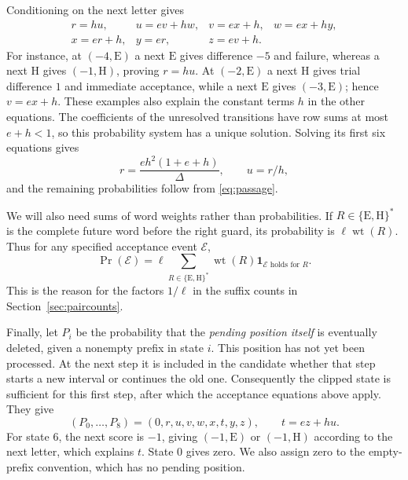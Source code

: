 \documentclass[11pt,a4paper]{article}
\theoremstyle{definition}
\theoremstyle{remark}
\newcommand{\wt}{\operatorname{wt}}
\newcommand{\E}{\mathrm E}
\newcommand{\HH}{\mathrm H}
\newcommand{\ind}{\mathbf1}
\begin{document}
Conditioning on the next letter gives
\begin{equation}\label{eq:passage}
\begin{array}{llll}
r=hu,&u=ev+hw,&v=ex+h,&w=ex+hy,\\
x=er+h,&y=er,&z=ev+h.&
\end{array}
\end{equation}
For instance, at $(-4,\E)$ a next $\E$ gives difference $-5$ and failure, whereas a next $\HH$ gives $(-1,\HH)$, proving $r=hu$. At $(-2,\E)$ a next $\HH$ gives trial difference $1$ and immediate acceptance, while a next $\E$ gives $(-3,\E)$; hence $v=ex+h$. These examples also explain the constant terms $h$ in the other equations. The coefficients of the unresolved transitions have row sums at most $e+h<1$, so this probability system has a unique solution. Solving its first six equations gives
\begin{equation}\label{eq:rclosed}
r=\frac{eh^2(1+e+h)}{\Delta},\qquad u=r/h,
\end{equation}
and the remaining probabilities follow from \eqref{eq:passage}.

We will also need sums of word weights rather than probabilities. If $R\in\{\E,\HH\}^*$ is the complete future word before the right guard, its probability is $\ell\wt(R)$. Thus for any specified acceptance event $\mathcal E$,
\begin{equation}\label{eq:suffix-normalization}
\Pr(\mathcal E)=\ell\sum_{R\in\{\E,\HH\}^*}\wt(R)\ind_{\mathcal E\text{ holds for }R}.
\end{equation}
This is the reason for the factors $1/\ell$ in the suffix counts in Section~\ref{sec:paircounts}.

Finally, let $P_i$ be the probability that the \emph{pending position itself} is eventually deleted, given a nonempty prefix in state $i$. This position has not yet been processed. At the next step it is included in the candidate whether that step starts a new interval or continues the old one. Consequently the clipped state is sufficient for this first step, after which the acceptance equations above apply. They give
\begin{equation}\label{eq:pvector}
(P_0,\ldots,P_8)=(0,r,u,v,w,x,t,y,z),\qquad t=ez+hu.
\end{equation}
For state 6, the next score is $-1$, giving $(-1,\E)$ or $(-1,\HH)$ according to the next letter, which explains $t$. State 0 gives zero. We also assign zero to the empty-prefix convention, which has no pending position.
\end{document}
